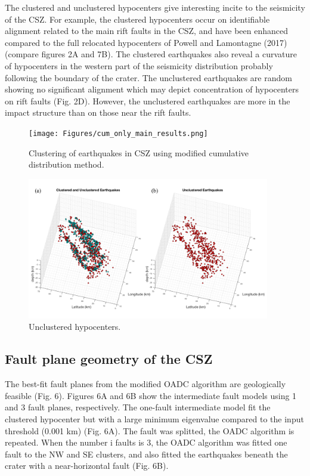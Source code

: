 \documentclass[draft]{agujournal2018}
\begin{document}
The clustered and unclustered hypocenters give interesting incite to the seismicity of the CSZ. For example, the clustered hypocenters occur on identifiable alignment related to the main rift faults in the CSZ, and have been enhanced compared to the full relocated hypocenters of Powell and Lamontagne (2017) (compare figures 2A and 7B). The clustered earthquakes also reveal a curvature of hypocenters in the western part of the seismicity distribution probably following the boundary of the crater. The unclustered earthquakes are random showing no significant alignment which may depict concentration of hypocenters on rift faults (Fig. 2D). However, the unclustered earthquakes are more in the impact structure than on those near the rift faults.


\begin{figure}[ht]
\centering
\texttt{[image: Figures/cum\_only\_main\_results.png]}
\caption{Clustering of earthquakes in CSZ using modified cumulative distribution method.}
\label{figtwo}
\end{figure}

\begin{figure}[ht]
\centering
\includegraphics[width=25pc]{Figures/unclustered_cum_only_results.png}
\caption{Unclustered hypocenters.}
\label{figthree}
\end{figure}
  
 
\subsection{Fault plane geometry of the CSZ}
The best-fit fault planes from the modified OADC algorithm are geologically feasible (Fig. 6). Figures 6A and 6B show the intermediate fault models using 1 and 3 fault planes, respectively. The one-fault intermediate model fit the clustered hypocenter but with a large minimum eigenvalue compared to the input threshold (0.001 km) (Fig. 6A). The fault was splitted, the OADC algorithm is repeated. When the number i faults is 3, the OADC algorithm was fitted one fault to the NW and SE clusters, and also fitted the earthquakes beneath the crater with a near-horizontal fault (Fig. 6B). 
\end{document}
